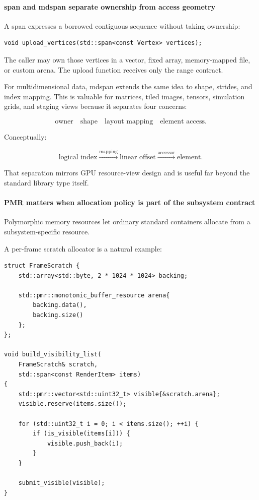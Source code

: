 \paragraph{span and mdspan separate ownership from access geometry}\label{span-and-mdspan-separate-ownership-from-access-geometry}

A span expresses a borrowed contiguous sequence without taking ownership:

\begin{verbatim}
void upload_vertices(std::span<const Vertex> vertices);
\end{verbatim}

The caller may own those vertices in a vector, fixed array, memory-mapped file, or custom arena. The upload function receives only the range contract.

For multidimensional data, mdspan extends the same idea to shape, strides, and index mapping. This is valuable for matrices, tiled images, tensors, simulation grids, and staging views because it separates four concerns:

\[
\text{owner}
\quad
\text{shape}
\quad
\text{layout mapping}
\quad
\text{element access}.
\]

Conceptually:

\[
\text{logical index}
\overset{\text{mapping}}{\longrightarrow}
\text{linear offset}
\overset{\text{accessor}}{\longrightarrow}
\text{element}.
\]

That separation mirrors GPU resource-view design and is useful far beyond the standard library type itself.

\paragraph{PMR matters when allocation policy is part of the subsystem contract}\label{pmr-matters-when-allocation-policy-is-part-of-the-subsystem-contract}

Polymorphic memory resources let ordinary standard containers allocate from a subsystem-specific resource.

A per-frame scratch allocator is a natural example:

\begin{verbatim}
struct FrameScratch {
    std::array<std::byte, 2 * 1024 * 1024> backing;

    std::pmr::monotonic_buffer_resource arena{
        backing.data(),
        backing.size()
    };
};

void build_visibility_list(
    FrameScratch& scratch,
    std::span<const RenderItem> items)
{
    std::pmr::vector<std::uint32_t> visible{&scratch.arena};
    visible.reserve(items.size());

    for (std::uint32_t i = 0; i < items.size(); ++i) {
        if (is_visible(items[i])) {
            visible.push_back(i);
        }
    }

    submit_visible(visible);
}
\end{verbatim}

